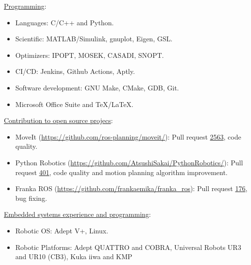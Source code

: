 \addskill%
{%
    \underline{Programming}:%
    \begin{itemize}[nosep, rightmargin=0cm]%
        \item Languages: C/C++ and Python.%
        \item Scientific: MATLAB/Simulink, gnuplot, Eigen, GSL.%
        \item Optimizers: IPOPT, MOSEK, CASADI, SNOPT.%
        \item CI/CD: Jenkins, Github Actions, Aptly.%
        \item Software development: GNU Make, CMake, GDB, Git.%
        \item Microsoft Office Suite and TeX/LaTeX.%
    \end{itemize}%
}%
\addskill%
{%
    \underline{Contribution to open source projecs}:%
    \begin{itemize}[nosep, rightmargin=0cm]%
        \item MoveIt (\url{https://github.com/ros-planning/moveit/}): Pull request \href{https://github.com/ros-planning/moveit/pull/2563}{2563}, code quality.
        \item Python Robotics (\url{https://github.com/AtsushiSakai/PythonRobotics/}): Pull request  \href{https://github.com/AtsushiSakai/PythonRobotics/pull/401}{401}, code quality and motion planning algorithm improvement.
        \item Franka ROS (\url{https://github.com/frankaemika/franka_ros}): Pull request \href{https://github.com/frankaemika/franka_ros/pull/176}{176}, bug fixing.
    \end{itemize}%
}%
\addskill%
{%
    \underline{Embedded systems experience and programming}:%
    \begin{itemize}[nosep, rightmargin=0cm]%
        \item Robotic OS: Adept V+, Linux.%
        \item Robotic Platforms: Adept QUATTRO and COBRA, Universal Robots UR3 and UR10 (CB3), Kuka iiwa and KMP%
    \end{itemize}%
}%

